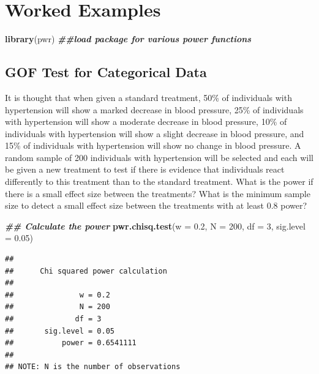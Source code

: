 \documentclass[
]{book}
\newenvironment{Shaded}{\begin{snugshade}}{\end{snugshade}}
\newcommand{\AttributeTok}[1]{\textcolor[rgb]{0.13,0.29,0.53}{#1}}
\newcommand{\DecValTok}[1]{\textcolor[rgb]{0.00,0.00,0.81}{#1}}
\newcommand{\DocumentationTok}[1]{\textcolor[rgb]{0.56,0.35,0.01}{\textbf{\textit{#1}}}}
\newcommand{\FloatTok}[1]{\textcolor[rgb]{0.00,0.00,0.81}{#1}}
\newcommand{\FunctionTok}[1]{\textcolor[rgb]{0.13,0.29,0.53}{\textbf{#1}}}
\newcommand{\NormalTok}[1]{#1}
\theoremstyle{definition}
\theoremstyle{definition}
\theoremstyle{definition}
\theoremstyle{definition}
\theoremstyle{remark}
\begin{document}
\hypertarget{worked-examples-1}{%
\section{Worked Examples}\label{worked-examples-1}}

\begin{Shaded}
\begin{Highlighting}[]
\FunctionTok{library}\NormalTok{(pwr) }\DocumentationTok{\#\#load package for various power functions}
\end{Highlighting}
\end{Shaded}

\hypertarget{gof-test-for-categorical-data}{%
\subsection{GOF Test for Categorical Data}\label{gof-test-for-categorical-data}}

It is thought that when given a standard treatment, 50\% of individuals with hypertension will show a marked decrease in blood pressure, 25\% of individuals with hypertension will show a moderate decrease in blood pressure, 10\% of individuals with hypertension will show a slight decrease in blood pressure, and 15\% of individuals with hypertension will show no change in blood pressure. A random sample of 200 individuals with hypertension will be selected and each will be given a new treatment to test if there is evidence that individuals react differently to this treatment than to the standard treatment. What is the power if there is a small effect size between the treatments? What is the minimum sample size to detect a small effect size between the treatments with at least 0.8 power?

\begin{Shaded}
\begin{Highlighting}[]
\DocumentationTok{\#\# Calculate the power}
\FunctionTok{pwr.chisq.test}\NormalTok{(}\AttributeTok{w =} \FloatTok{0.2}\NormalTok{, }\AttributeTok{N =} \DecValTok{200}\NormalTok{, }\AttributeTok{df =} \DecValTok{3}\NormalTok{, }\AttributeTok{sig.level =} \FloatTok{0.05}\NormalTok{)}
\end{Highlighting}
\end{Shaded}

\begin{verbatim}
## 
##      Chi squared power calculation 
## 
##               w = 0.2
##               N = 200
##              df = 3
##       sig.level = 0.05
##           power = 0.6541111
## 
## NOTE: N is the number of observations
\end{verbatim}
\end{document}
